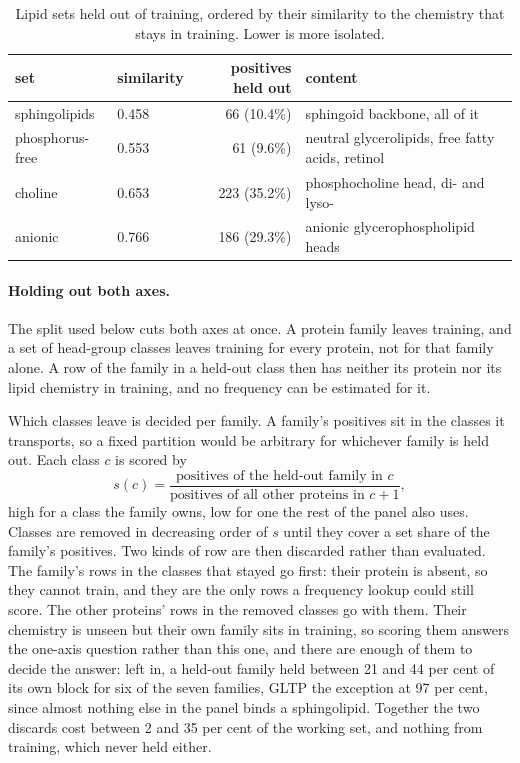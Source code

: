 \begin{table}[htbp]
\centering
\begin{tabular}{llrl}
\hline
set & similarity & positives held out & content \\
\hline
sphingolipids & 0.458 & 66 (10.4\%) & sphingoid backbone, all of it \\
phosphorus-free & 0.553 & 61 (9.6\%) & neutral glycerolipids, free fatty acids, retinol \\
choline & 0.653 & 223 (35.2\%) & phosphocholine head, di- and lyso- \\
anionic & 0.766 & 186 (29.3\%) & anionic glycerophospholipid heads \\
\hline
\end{tabular}
\caption{Lipid sets held out of training, ordered by their similarity to the chemistry that stays
in training. Lower is more isolated.}
\label{tab:lipidsets}
\end{table}

\paragraph{Holding out both axes.} The split used below cuts both axes at once. A protein family
leaves training, and a set of head-group classes leaves training for every protein, not for that
family alone. A row of the family in a held-out class then has neither its protein nor its lipid
chemistry in training, and no frequency can be estimated for it.

Which classes leave is decided per family. A family's positives sit in the classes it transports,
so a fixed partition would be arbitrary for whichever family is held out. Each class $c$ is scored
by
\[
s(c) = \frac{\text{positives of the held-out family in } c}{\text{positives of all other proteins in } c + 1},
\]
high for a class the family owns, low for one the rest of the panel also uses. Classes are removed
in decreasing order of $s$ until they cover a set share of the family's positives. Two kinds of
row are then discarded rather than evaluated. The family's rows in the classes that stayed go
first: their protein is absent, so they cannot train, and they are the only rows a frequency
lookup could still score. The other proteins' rows in the removed classes go with them. Their
chemistry is unseen but their own family sits in training, so scoring them answers the one-axis
question rather than this one, and there are enough of them to decide the answer: left in, a
held-out family held between 21 and 44 per cent of its own block for six of the seven families,
GLTP the exception at 97 per cent, since almost nothing else in the panel binds a sphingolipid.
Together the two discards cost between 2 and 35 per cent of the working set, and nothing from
training, which never held either.

